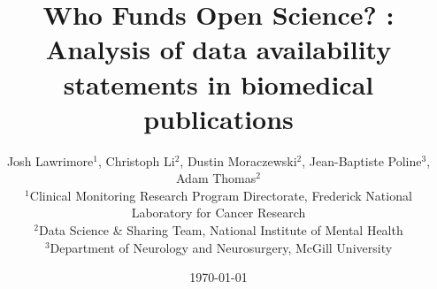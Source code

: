 
\title{Who Funds Open Science? : Analysis of data availability statements in biomedical publications}

\author{
    Josh Lawrimore$^{1}$,
    Christoph Li$^{2}$,
    Dustin Moraczewski$^{2}$,
    Jean-Baptiste Poline$^{3}$,
    Adam Thomas$^{2}$ \\[1em]
    \small $^1$Clinical Monitoring Research Program Directorate, Frederick National Laboratory for Cancer Research \\
    \small $^2$Data Science \& Sharing Team, National Institute of Mental Health \\
    \small $^3$Department of Neurology and Neurosurgery, McGill University
}

\date{\today}
